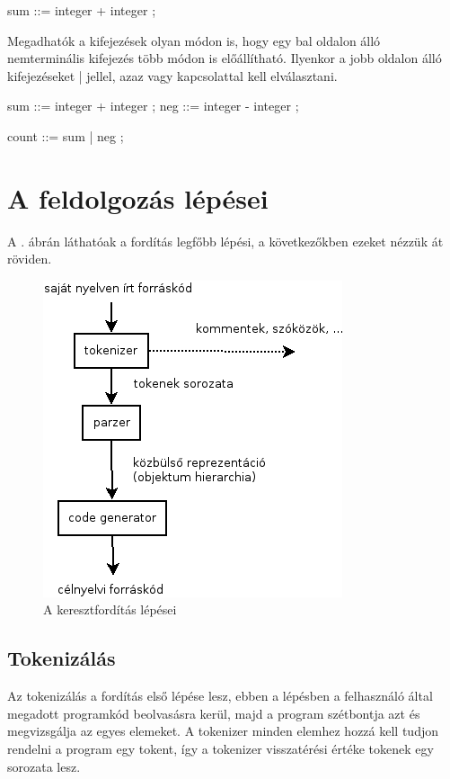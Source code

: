 sum ::=	integer + integer
	;

Megadhatók a kifejezések olyan módon is, hogy egy bal oldalon álló nemterminális kifejezés több módon is előállítható. Ilyenkor a jobb oldalon álló kifejezéseket | jellel, azaz vagy kapcsolattal kell elválasztani.

sum ::= integer + integer
	;
neg ::= integer - integer
	;

count ::= sum 
	| neg
	;



\section{A feldolgozás lépései}

A . ábrán láthatóak a fordítás legfőbb lépési, a következőkben ezeket nézzük át röviden.

\begin{figure}
\centering
\includegraphics[scale=1]{kepek/process.png}
\caption{A keresztfordítás lépései}
\label{fig:process}
\end{figure}

\subsection{Tokenizálás}

Az tokenizálás a fordítás első lépése lesz, ebben a lépésben a felhasználó által megadott programkód beolvasásra kerül, majd a program szétbontja azt és megvizsgálja az egyes elemeket. A tokenizer minden elemhez hozzá kell tudjon rendelni a program egy tokent, így a tokenizer visszatérési értéke tokenek egy sorozata lesz.


